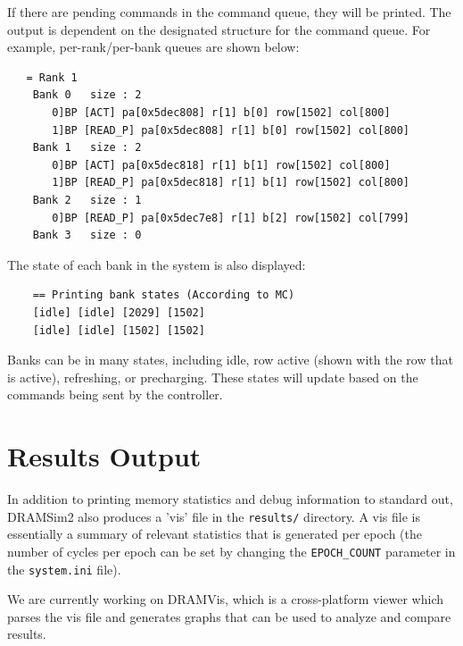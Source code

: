\documentclass[11pt]{article}
\begin{document}
If there are pending commands in the command queue, they will be
printed.  The output is dependent on the designated structure for
the command queue.  For example, per-rank/per-bank queues are 
shown below:
\begin{lstlisting}
   = Rank 1
    Bank 0   size : 2
       0]BP [ACT] pa[0x5dec808] r[1] b[0] row[1502] col[800]
       1]BP [READ_P] pa[0x5dec808] r[1] b[0] row[1502] col[800]
    Bank 1   size : 2
       0]BP [ACT] pa[0x5dec818] r[1] b[1] row[1502] col[800]
       1]BP [READ_P] pa[0x5dec818] r[1] b[1] row[1502] col[800]
    Bank 2   size : 1
       0]BP [READ_P] pa[0x5dec7e8] r[1] b[2] row[1502] col[799]
    Bank 3   size : 0
\end{lstlisting}

The state of each bank in the system is also displayed:
\begin{lstlisting}
    == Printing bank states (According to MC)
    [idle] [idle] [2029] [1502] 
    [idle] [idle] [1502] [1502] 
\end{lstlisting}
Banks can be in many states, including idle, row active (shown
with the row that is active), refreshing, or precharging.  These
states will update based on the commands being sent by the 
controller.  

\section{Results Output}

In addition to printing memory statistics and debug information to standard out, DRAMSim2 also produces
a 'vis' file in the \texttt{results/} directory. A vis file is essentially a summary of relevant statistics that is generated
per epoch (the number of cycles per epoch can be set by changing the \texttt{EPOCH\_COUNT} parameter in the \texttt{system.ini} file). 

We are currently working on DRAMVis, which is a cross-platform viewer which parses the vis file and generates graphs that can be used
to analyze and compare results.
\end{document}
